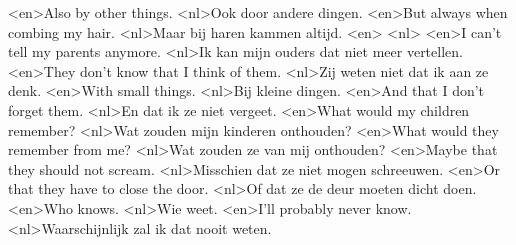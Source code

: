 <en>Also by other things.
<nl>Ook door andere dingen.
<en>But always when combing my hair.
<nl>Maar bij haren kammen altijd.
<en>
<nl>
<en>I can't tell my parents anymore.
<nl>Ik kan mijn ouders dat niet meer vertellen.
<en>They don't know that I think of them.
<nl>Zij weten niet dat ik aan ze denk.
<en>With small things.
<nl>Bij kleine dingen.
<en>And that I don't forget them.
<nl>En dat ik ze niet vergeet.
<en>What would my children remember?
<nl>Wat zouden mijn kinderen onthouden?
<en>What would they remember from me?
<nl>Wat zouden ze van mij onthouden?
<en>Maybe that they should not scream.
<nl>Misschien dat ze niet mogen schreeuwen.
<en>Or that they have to close the door.
<nl>Of dat ze de deur moeten dicht doen.
<en>Who knows.
<nl>Wie weet.
<en>I'll probably never know.
<nl>Waarschijnlijk zal ik dat nooit weten.
